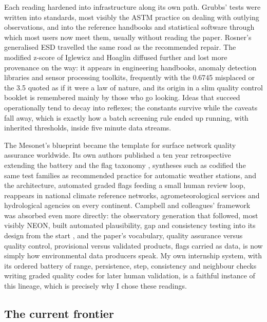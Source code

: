 Each reading hardened into infrastructure along its own path. Grubbs' tests
were written into standards, most visibly the ASTM practice on dealing with
outlying observations, and into the reference handbooks and statistical
software through which most users now meet them, usually without reading the
paper. Rosner's generalised ESD travelled the same road as the recommended
repair. The modified z-score of Iglewicz and Hoaglin diffused further and
lost more provenance on the way: it appears in engineering handbooks,
anomaly detection libraries and sensor processing toolkits, frequently with
the 0.6745 misplaced or the 3.5 quoted as if it were a law of nature, and
its origin in a slim quality control booklet is remembered mainly by those
who go looking. Ideas that succeed operationally tend to decay into reflexes;
the constants survive while the caveats fall away, which is exactly how a
batch screening rule ended up running, with inherited thresholds, inside
five minute data streams.

The Mesonet's blueprint became the template for surface network quality
assurance worldwide. Its own authors published a ten year retrospective
extending the battery and the flag taxonomy \citep{fiebrich2010}, syntheses
such as \citet{estevez2011} codified the same test families as recommended
practice for automatic weather stations, and the architecture, automated
graded flags feeding a small human review loop, reappears in national
climate reference networks, agrometeorological services and hydrological
agencies on every continent. Campbell and colleagues' framework was absorbed
even more directly: the observatory generation that followed, most visibly
NEON, built automated plausibility, gap and consistency testing into its
design from the start \citep{taylor2013}, and the paper's vocabulary,
quality assurance versus quality control, provisional versus validated
products, flags carried as data, is now simply how environmental data
producers speak. My own internship system, with its ordered battery of
range, persistence, step, consistency and neighbour checks writing graded
quality codes for later human validation, is a faithful instance of this
lineage, which is precisely why I chose these readings.

\subsection{The current frontier}
\label{sec:fut-frontier}

